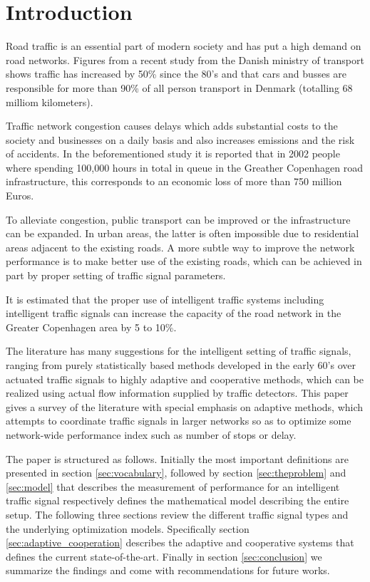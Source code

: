 \section{Introduction}

Road traffic is an essential part of modern society and has put a high
demand on road networks. Figures from a recent study from the Danish
ministry of transport \cite{47} shows traffic has increased by 50\%
since the 80's and that cars and busses are responsible for more than
90\% of all person transport in Denmark (totalling 68 milliom
kilometers).

Traffic network congestion causes delays which adds substantial costs
to the society and businesses on a daily basis and also increases
emissions and the risk of accidents. In the beforementioned study it
is reported that in 2002 people where spending 100,000 hours in total
in queue in the Greather Copenhagen road infrastructure, this
corresponds to an economic loss of more than 750 million Euros.  

To alleviate congestion, public transport can be improved or the
infrastructure can be expanded. In urban areas, the latter is often
impossible due to residential areas adjacent to the existing roads.  A
more subtle way to improve the network performance is to make better
use of the existing roads, which can be achieved in part by proper
setting of traffic signal parameters.

It is estimated that the proper use of intelligent traffic systems
including intelligent traffic signals can increase the capacity of the
road network in the Greater Copenhagen area by 5 to 10\%.

The literature has many suggestions for the intelligent setting of
traffic signals, ranging from purely statistically based methods
developed in the early 60's over actuated traffic signals to highly
adaptive and cooperative methods, which can be realized using actual
flow information supplied by traffic detectors. This paper gives a
survey of the literature with special emphasis on adaptive methods,
which attempts to coordinate traffic signals in larger networks so as
to optimize some network-wide performance index such as number of
stops or delay.

The paper is structured as follows. Initially the most important
definitions are presented in section \ref{sec:vocabulary}, followed by
section \ref{sec:theproblem} and \ref{sec:model} that describes the
measurement of performance for an intelligent traffic signal
respectively defines the mathematical model describing the entire
setup. The following three sections review the different traffic
signal types and the underlying optimization models. Specifically
section \ref{sec:adaptive_cooperation} describes the adaptive and
cooperative systems that defines the current state-of-the-art. Finally
in section \ref{sec:conclusion} we summarize the findings and come
with recommendations for future works.
